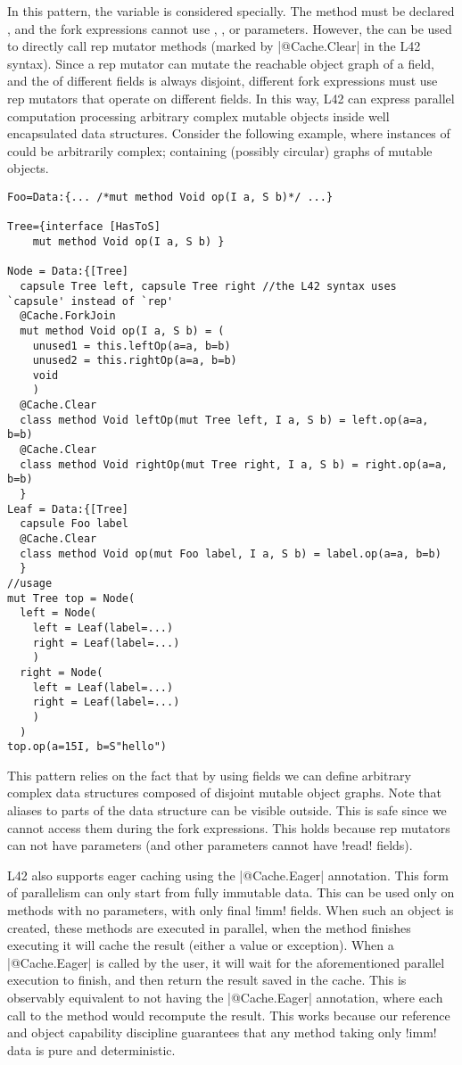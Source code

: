 In this pattern, the \Q@this@ variable is considered specially.
The method must be declared \Q@mut@, and the 
fork expressions cannot
use \Q@mut@, \Q@lent@, or \Q@read@ parameters.
However, the \Q@mut@ \Q@this@ can be used to directly call
rep mutator methods (marked by \Q|@Cache.Clear| in the L42 syntax).
Since a rep mutator can mutate the reachable object graph of a \Q@rep@ field, and the \mrog of different \Q@rep@ fields is always disjoint, 
different fork expressions must use rep mutators that operate on different \Q@rep@ fields.
In this way, L42 can express parallel computation processing arbitrary complex mutable objects inside well encapsulated data structures.
Consider the following example, where instances of \Q@Foo@ could be arbitrarily complex; containing (possibly circular) graphs of mutable objects.
\begin{lstlisting}[deletekeywords=label]
Foo=Data:{... /*mut method Void op(I a, S b)*/ ...}

Tree={interface [HasToS]
	mut method Void op(I a, S b) }

Node = Data:{[Tree] 
  capsule Tree left, capsule Tree right //the L42 syntax uses `capsule' instead of `rep'
  @Cache.ForkJoin
  mut method Void op(I a, S b) = (
    unused1 = this.leftOp(a=a, b=b)
    unused2 = this.rightOp(a=a, b=b)
    void
    )
  @Cache.Clear
  class method Void leftOp(mut Tree left, I a, S b) = left.op(a=a, b=b)
  @Cache.Clear
  class method Void rightOp(mut Tree right, I a, S b) = right.op(a=a, b=b)
  }
Leaf = Data:{[Tree]
  capsule Foo label
  @Cache.Clear
  class method Void op(mut Foo label, I a, S b) = label.op(a=a, b=b)
  }
//usage
mut Tree top = Node(
  left = Node(
    left = Leaf(label=...)
    right = Leaf(label=...)
    )
  right = Node(
    left = Leaf(label=...)
    right = Leaf(label=...)
    )
  )
top.op(a=15I, b=S"hello")
\end{lstlisting}

This pattern relies on the fact that by using \Q@rep@ fields we can define arbitrary complex data structures composed of disjoint mutable object graphs.
Note that \Q@read@ aliases to parts of the data structure can be visible outside.
This is safe since we cannot access them during the fork expressions. This holds because rep mutators can not have \Q@read@ parameters (and other parameters cannot have \Q!read! fields).

L42 also supports eager caching using the \Q|@Cache.Eager| annotation.
This form of parallelism can only start from fully immutable data.
This can be used only on methods with no parameters,
with only final \Q!imm! fields.
When such an object is created, these methods are executed in parallel, when the method finishes executing it will cache the result (either a value or exception).
When a \Q|@Cache.Eager| is called by the user, it will wait for the aforementioned parallel execution to finish, and then return the result saved in the cache.
This is observably equivalent to not having the \Q|@Cache.Eager| annotation, where each call to the method would recompute the result.
This works because our reference and object capability discipline guarantees that any method taking only \Q!imm! data is pure and deterministic.

